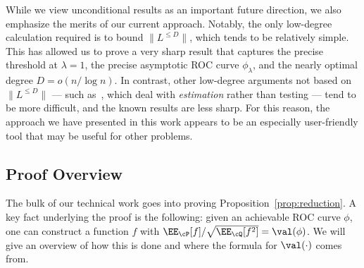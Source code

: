 \documentclass[11pt]{article}
\begin{document}
While we view unconditional results as an important future direction, we also emphasize the merits of our current approach. Notably, the only low-degree calculation required is to bound $\|L^{\le D}\|$, which tends to be relatively simple. This has allowed us to prove a very sharp result that captures the precise threshold at $\lambda = 1$, the precise asymptotic ROC curve $\phi_\lambda$, and the nearly optimal degree $D = o(n/\log n)$. In contrast, other low-degree arguments not based on $\|L^{\le D}\|$ --- such as~\cite{SW-estimation,MW-amp}, which deal with \emph{estimation} rather than testing --- tend to be more difficult, and the known results are less sharp. For this reason, the approach we have presented in this work appears to be an especially user-friendly tool that may be useful for other problems.

\subsection{Proof Overview}
\label{sec:pf-overview}

The bulk of our technical work goes into proving Proposition~\ref{prop:reduction}. A key fact underlying the proof is the following: given an achievable ROC curve $\phi$, one can construct a function $f$ with $\EE_{\cP}[f]/\sqrt{\EE_{\cQ}[f^2]} = \val(\phi)$. We will give an overview of how this is done and where the formula for $\val(\cdot)$ comes from.
\end{document}
